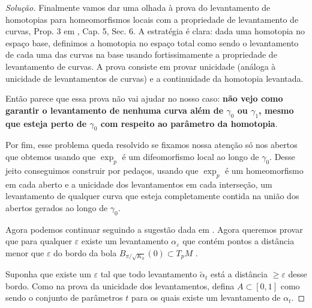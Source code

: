 \begin{proof}[Solução]
Finalmente vamos dar uma olhada à prova do levantamento de homotopias para homeomorfismos locais com a propriedade de levantamento de curvas, Prop. 3 em \cite{docsu}, Cap. 5, Sec. 6. A estratégia é clara: dada uma homotopia no espaço base, definimos a homotopia no espaço total como sendo o levantamento de cada uma das curvas na base usando fortissimamente a propriedade de levantamento de curvas. A prova consiste em provar unicidade (análoga à unicidade de levantamentos de curvas) e a continuidade da homotopia levantada.

Então parece que essa prova não vai ajudar no nosso caso: \textbf{não vejo como garantir o levantamento de nenhuma curva além de \(\gamma_0\) ou \(\gamma_1\), mesmo que esteja perto de \(\gamma_0\) com respeito ao parâmetro da homotopia}.

Por fim, esse problema queda resolvido se fixamos nossa atenção só nos abertos que obtemos usando que \(\operatorname{exp}_p\) é um difeomorfismo local ao longo de \(\gamma_0\). Desse jeito conseguimos construir por pedaços, usando que \(\operatorname{exp}_p\) é um homeomorfismo em cada aberto e a unicidade dos levantamentos em cada interseção, um levantamento de qualquer curva que esteja completamente contida na união dos abertos gerados ao longo de \(\gamma_0\).

Agora podemos continuar seguindo a sugestão dada em \cite{doc}. Agora queremos provar que para qualquer \(\varepsilon\) existe um levantamento \(\alpha_\varepsilon\) que contém pontos a distância menor que \(\varepsilon\) do bordo da bola \(B_{\pi/\sqrt{K_0}}(0)\subset T_pM\) .

Suponha que existe um \(\varepsilon\) tal que todo levantamento \(\tilde{\alpha}_t\) está a distância \(\geq \varepsilon\) desse bordo. Como na prova da unicidade dos levantamentos, defina \(A \subset [0,1]\) como sendo o conjunto de parâmetros \(t\) para os quais existe um levantamento de \(\alpha_t\).

\end{proof}

